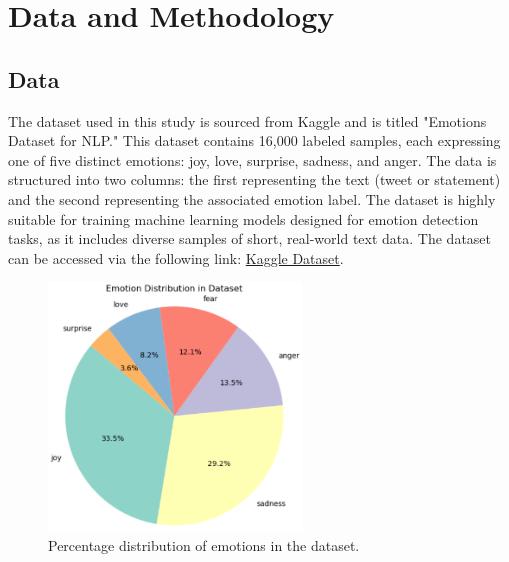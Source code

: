 

\section{Data and Methodology}

\subsection{Data}
The dataset used in this study is sourced from Kaggle and is titled "Emotions Dataset for NLP." This dataset contains 16,000 labeled samples, each expressing one of five distinct emotions: joy, love, surprise, sadness, and anger. The data is structured into two columns: the first representing the text (tweet or statement) and the second representing the associated emotion label. The dataset is highly suitable for training machine learning models designed for emotion detection tasks, as it includes diverse samples of short, real-world text data. The dataset can be accessed via the following link: \href{https://www.kaggle.com/datasets/praveengovi/emotions-dataset-for-nlp/data}{\color{blue}Kaggle Dataset}.

\begin{figure}[H]
    \centering
    \includegraphics[width=0.6\textwidth]{images/emotion_pie.png}
    \caption{Percentage distribution of emotions in the dataset.}
    \label{fig:emotion_pie}
\end{figure}

